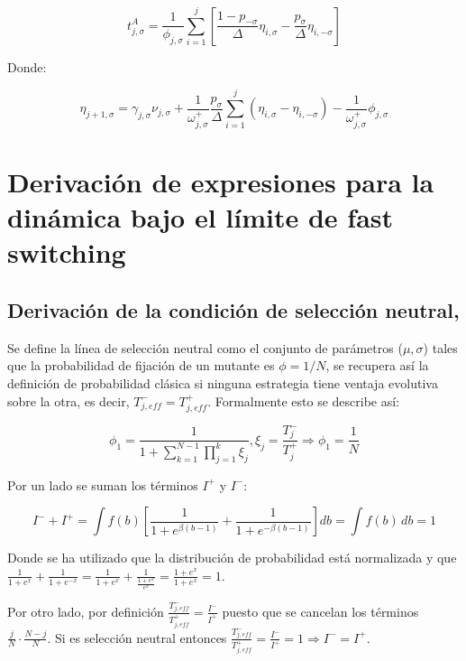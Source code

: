 \documentclass[%
 sor,
 jor,
 amsmath,amssymb,
 reprint,%
]{revtex4-2}
\begin{document}
\[
    t^A_{j, \sigma} = \frac{1}{\phi_{j, \sigma}} \sum_{i=1}^{j} \left[ \frac{1 - p_{-\sigma}}{\Delta} \eta_{i, \sigma} - \frac{p_\sigma}{\Delta} \eta_{i, -\sigma} \right]
\]

Donde:

\[
    \eta_{j+1, \sigma} = \gamma_{j, \sigma} \nu_{j, \sigma} + \frac{1}{\omega^+_{j, \sigma}} \frac{p_\sigma}{\Delta} \sum_{i=1}^{j} (\eta_{i, \sigma} - \eta_{i, -\sigma}) - \frac{1}{\omega^+_{j, \sigma}} \phi_{j, \sigma}
\]



\section{Derivación de expresiones para la dinámica bajo el límite de fast switching}
\label{ApendiceC}
\subsection{Derivación de la condición de selección neutral, \cite{Ruben}}

Se define la línea de selección neutral como el conjunto de parámetros ($\mu,\sigma$) tales que la probabilidad de fijación de un mutante es $\phi=1/N$, se recupera así la definición de probabilidad clásica si ninguna estrategia tiene ventaja evolutiva sobre la otra, es decir, \(T_{j,eff}^-=T_{j,eff}^+\). Formalmente esto se describe así:

\[
    \phi_1=\frac{1}{1+\sum_{k=1}^{N-1}\prod_{j=1}^{k} \xi_j} , \xi_j=\frac{T_j^-}{T_j^+} \Rightarrow \phi_1=\frac{1}{N}
\]

\vspace{0,2 cm}
Por un lado se suman los términos \(I^+\) y \(I^-\):

\[
I^- + I^+ = \int f(b) \left[ \frac{1}{1 + e^{\beta (b-1)}} + \frac{1}{1 + e^{-\beta (b-1)}} \right] db = \int f(b)\, db = 1 
\]

Donde se ha utilizado que la distribución de probabilidad está normalizada y que \(\frac{1}{1 + e^{x}} + \frac{1}{1 + e^{-x}}=\frac{1}{1 + e^{x}} + \frac{1}{\frac{1+e^x}{e^x}} =\frac{1 + e^{x}}{1 + e^{x}}=1\).

\vspace{0,2 cm}

Por otro lado, por definición \(\frac{T_{j,eff}^-}{T_{j,eff}^+}=\frac{I^-}{I^+}\) puesto que se cancelan los términos \(\frac{j}{N} \cdot \frac{N - j}{N}\). Si es selección neutral entonces \(\frac{T_{j,eff}^-}{T_{j,eff}^+}=\frac{I^-}{I^+}=1 \Rightarrow I^-=I^+\). 
\end{document}
